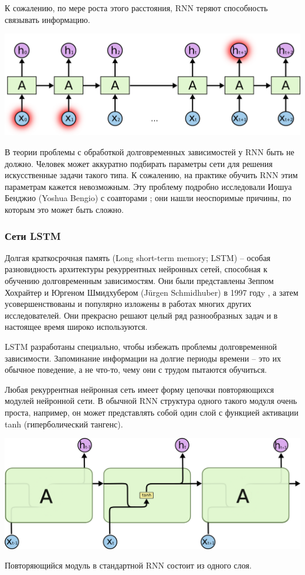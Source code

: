 \documentclass[12pt, a4paper, titlepage]{extreport}
\begin{document}
	К сожалению, по мере роста этого расстояния, RNN теряют способность связывать информацию.
	\begin{center} 
		\includegraphics[scale=0.2]{problem_activation_rnn.png}\\
	\end{center}
	В теории проблемы с обработкой долговременных зависимостей у RNN быть не должно. Человек может аккуратно подбирать параметры сети для решения искусственные задачи такого типа. К сожалению, на практике обучить RNN этим параметрам кажется невозможным. Эту проблему подробно исследовали Иошуа Бенджио (Yoshua Bengio) с соавторами \cite{9}; они нашли неоспоримые причины, по которым это может быть сложно.
	\subsubsection*{Сети LSTM}
	Долгая краткосрочная память (Long short-term memory; LSTM) – особая разновидность архитектуры рекуррентных нейронных сетей, способная к обучению долговременным зависимостям. Они были представлены Зеппом Хохрайтер и Юргеном Шмидхубером (Jürgen Schmidhuber) в 1997 годy \cite{10}, а затем усовершенствованы и популярно изложены в работах многих других исследователей. Они прекрасно решают целый ряд разнообразных задач и в настоящее время широко используются.
	
	LSTM разработаны специально, чтобы избежать проблемы долговременной зависимости. Запоминание информации на долгие периоды времени – это их обычное поведение, а не что-то, чему они с трудом пытаются обучиться.
	
	Любая рекуррентная нейронная сеть имеет форму цепочки повторяющихся модулей нейронной сети. В обычной RNN структура одного такого модуля очень проста, например, он может представлять собой один слой с функцией активации tanh (гиперболический тангенс).
	\begin{center} 
		\includegraphics[scale=0.2]{tanh_act.png}\\
	\end{center}
	Повторяющийся модуль в стандартной RNN состоит из одного слоя.
	
\end{document}
